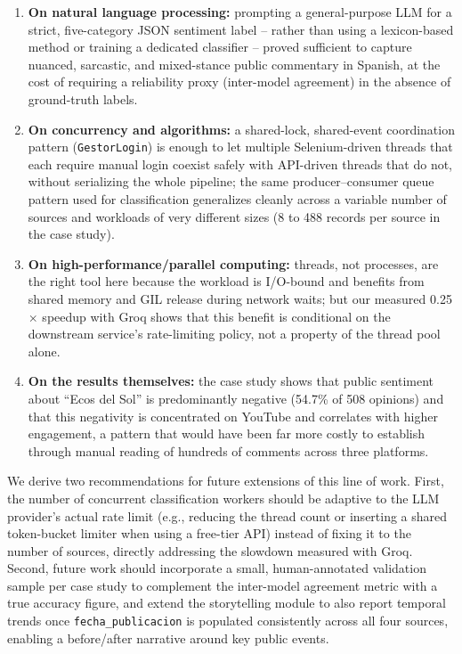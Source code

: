 \documentclass[runningheads]{llncs}
\begin{document}
\begin{enumerate}
\item \textbf{On natural language processing:} prompting a general-purpose
LLM for a strict, five-category JSON sentiment label -- rather than using a
lexicon-based method or training a dedicated classifier -- proved sufficient
to capture nuanced, sarcastic, and mixed-stance public commentary in
Spanish, at the cost of requiring a reliability proxy (inter-model
agreement) in the absence of ground-truth labels.
\item \textbf{On concurrency and algorithms:} a shared-lock, shared-event
coordination pattern (\texttt{GestorLogin}) is enough to let multiple
Selenium-driven threads that each require manual login coexist safely with
API-driven threads that do not, without serializing the whole pipeline; the
same producer--consumer queue pattern used for classification generalizes
cleanly across a variable number of sources and workloads of very different
sizes (8 to 488 records per source in the case study).
\item \textbf{On high-performance/parallel computing:} threads, not
processes, are the right tool here because the workload is I/O-bound and
benefits from shared memory and GIL release during network waits; but our
measured 0.25$\times$ speedup with Groq shows that this benefit is
conditional on the downstream service's rate-limiting policy, not a
property of the thread pool alone.
\item \textbf{On the results themselves:} the case study shows that public
sentiment about ``Ecos del Sol'' is predominantly negative (54.7\% of 508
opinions) and that this negativity is concentrated on YouTube and correlates
with higher engagement, a pattern that would have been far more costly to
establish through manual reading of hundreds of comments across three
platforms.
\end{enumerate}

We derive two recommendations for future extensions of this line of work.
First, the number of concurrent classification workers should be adaptive
to the LLM provider's actual rate limit (e.g., reducing the thread count or
inserting a shared token-bucket limiter when using a free-tier API) instead
of fixing it to the number of sources, directly addressing the slowdown
measured with Groq. Second, future work should incorporate a small,
human-annotated validation sample per case study to complement the
inter-model agreement metric with a true accuracy figure, and extend the
storytelling module to also report temporal trends once \texttt{fecha\_publicacion}
is populated consistently across all four sources, enabling a
before/after narrative around key public events.



\end{document}
